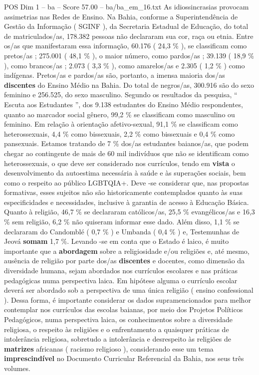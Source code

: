 \begin{textsample}{POS Dim 1 – ba – Score 57.00 – ba/ba\_em\_16.txt}
As idiossincrasias provocam assimetrias nas Redes de Ensino.
Na Bahia, conforme a Superintendência de Gestão da Informação ( SGINF ), da Secretaria Estadual de Educação, do total de matriculados/as, 178.382 pessoas não declararam sua cor, raça ou etnia.
Entre os/as que manifestaram essa informação, 60.176 ( 24,3 \% ), se classificam como pretos/as ; 275.001 ( 48,1 \% ), o maior número, como pardos/as ; 39.139 ( 18,9 \% ), como brancos/as ; 2.073 ( 3,3 \% ), como amarelos/as e 2.305 ( 1,2 \% ) como indígenas.
Pretos/as e pardos/as são, portanto, a imensa maioria dos/as \textbf{discentes} do Ensino Médio na Bahia.
Do total de negros/as, 300.916 são do sexo feminino e 256.525, do sexo masculino.
Segundo os resultados da pesquisa, “ Escuta aos Estudantes ”, dos 9.138 estudantes do Ensino Médio respondentes, quanto ao marcador social gênero, 99,2 \% se classificam como masculino ou feminino.
Em relação à orientação afetivo-sexual, 91,1 \% se classificam como heterossexuais, 4,4 \% como bissexuais, 2,2 \% como bissexuais e 0,4 \% como pansexuais.
Estamos tratando de 7 \% dos/as estudantes baianos/as, que podem chegar ao contingente de mais de 60 mil indivíduos que não se identificam como heterossexuais, o que deve ser considerado nos currículos, tendo em \textbf{vista} o desenvolvimento da autoestima necessária à saúde e às superações sociais, bem como o respeito ao público LGBTQIA+.
Deve -se considerar que, nas propostas formativas, esses sujeitos não são historicamente contemplados quanto às suas especificidades e necessidades, inclusive à garantia de acesso à Educação Básica.
Quanto à religião, 46,7 \% se declararam católicos/as, 25,5 \% evangélicos/as e 16,3 \% sem religião, 6,2 \% não quiseram informar esse dado.
Além disso, 1,1 \% se declararam do Candomblé ( 0,7 \% ) e Umbanda ( 0,4 \% ) e, Testemunhas de Jeová \textbf{somam} 1,7 \%.
Levando -se em conta que o Estado é laico, é muito importante que a \textbf{abordagem} sobre a religiosidade e/ou religiões e, até mesmo, ausência de religião por parte dos/as \textbf{discentes} e docentes, como dimensão da diversidade humana, sejam abordados nos currículos escolares e nas práticas pedagógicas numa perspectiva laica.
Em hipótese alguma o currículo escolar deverá ser abordado sob a perspectiva de uma única religião ( ensino confessional ).
Dessa forma, é importante considerar os dados supramencionados para melhor contemplar nos currículos das escolas baianas, por meio dos Projetos Políticos Pedagógicos, numa perspectiva laica, os conhecimentos sobre a diversidade religiosa, o respeito às religiões e o enfrentamento a quaisquer práticas de intolerância religiosa, sobretudo a intolerância e desrespeito às religiões de \textbf{matrizes} africanas ( racismo religioso ), considerando esse um tema \textbf{imprescindível} no Documento Curricular Referencial da Bahia, nos seus três volumes.

\end{textsample}
